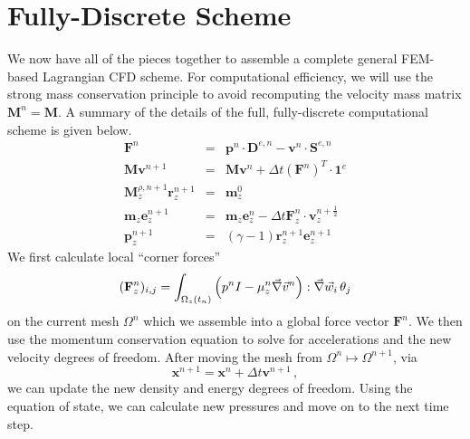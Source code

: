 \section{Fully-Discrete Scheme}
We now have all of the pieces together to assemble a complete general FEM-based Lagrangian CFD scheme. For computational efficiency, we will use the strong mass conservation principle  to avoid recomputing the velocity mass matrix $\mathbf{M}^n = \mathbf{M}$.
A summary of the details of the full, fully-discrete computational scheme is given below.
\begin{eqnarray*}
\mathbf{F}^n &=& \mathbf{p}^n \cdot \mathbf{D}^{e,n}  -
  \mathbf{v}^n \cdot \mathbf{S}^{e,n} 
\\
\mathbf{M} \mathbf{v}^{n+1} &=& \mathbf{M} \mathbf{v}^n +
  \Delta t (\mathbf{F}^n )^T\!\!\cdot \mathbf{1}^e 
\\
\mathbf{M}^{\rho,n+1}_z \mathbf{r}^{n+1}_z &=&
 \mathbf{m}_z^0 
\\
\mathbf{m}_z \mathbf{e}^{n+1}_z &=& \mathbf{m}_z \mathbf{e}^{n}_z
  - \Delta t \mathbf{F}^n_z \cdot \mathbf{v}^{n+\frac{1}{2}}_z 
\\
\mathbf{p}^{n+1}_z &=& (\gamma-1)\mathbf{r}^{n+1}_z \mathbf{e}^{n+1}_z
\end{eqnarray*}
We first calculate local ``corner forces''
$$
(\mathbf{F}^n_z)_{i,j} = \int_{\Omega_z(t_n)} \left(
p^n I - \mu_z^n \vec \nabla \vec v^n \right) : \vec \nabla \vec w_i\, \theta_j
$$
on the current mesh $\Omega^n$ which we assemble into a global force vector $\mathbf{F}^n$. We then use the momentum conservation equation to solve for accelerations and the new velocity degrees of freedom. After moving the mesh from $\Omega^n \mapsto \Omega^{n+1}$, via 
$$
\mathbf{x}^{n+1} =
\mathbf{x}^{n} + \Delta t \mathbf{v}^{n+1} \,,
$$
we can update the new density and energy degrees of freedom. Using the equation of state, we can calculate new pressures and move on to the next time step. 